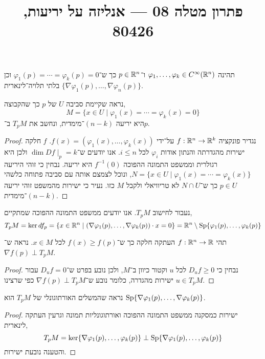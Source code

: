 
\title{פתרון מטלה 08 --- אנליזה על יריעות, 80426}

\DeclareMathOperator{\vol}{vol}


\maketitle
\maketitleprint[blue]

\question{}
תהינה $\varphi_1, \ldots, \varphi_k \in C^\infty(\mathbb{R}^n)$ ו־$p \in \mathbb{R}^n$ כך ש־$\varphi_1(p) = \cdots = \varphi_k(p) = 0$ וכן $\{ \nabla \varphi_1(p), \ldots, \nabla \varphi_n(p) \}$ בלתי תלויה־לינארית.

\subquestion{}
נראה שקיימת סביבה $U$ של $p$ כך שהקבוצה,
\[
	M
	= \{ x \in U \mid \varphi_1(x) = \cdots = \varphi_k(x) = 0 \}
\]
היא יריעה $(n - k)$־מימדית,
ונחשב את $T_p M$ ב־$p$.
\begin{proof}
	נגדיר פונקציה $f : \mathbb{R}^n \to \mathbb{R}^k$ על־ידי $f(x) = (\varphi_1(x), \ldots, \varphi_k(x))$.
	$f$ חלקה ישירות מהגדרתה והנתון אודות $\varphi_i$ לכל $i \le n$.
	אנו יודעים ש־$\dim D f \mid_p = k$ ולכן היא רגולרית וממשפט התמונה ההפוכה $f^{-1}(0)$ היא יריעה.
	נבחין כי זוהי היריעה $N = \{ x \in U \mid \varphi_1(x) = \cdots = \varphi_k(x) \}$, ונוכל לצמצם אותה עם סביבה פתוחה כלשהי $p \in U$ כך ש־$N \cap U$ לא טריוויאלי ולקבל $M$ כזו.
	נעיר כי ישירות מהמשפט זוהי יריעה $(n - k)$־מימדית.
\end{proof}
נעבור לחישוב $T_p M$.
אנו יודעים ממשפט התמונה ההפוכה שמתקיים,
\[
	T_p M
	= \ker df_p
	= \{ x \in \mathbb{R}^n \mid (\nabla \varphi_1(p), \ldots, \nabla \varphi_k(p)) \cdot x = 0 \}
	= \mathbb{R}^n \setminus \operatorname{Sp}\{ \varphi_1(p), \ldots, \varphi_k(p) \}
\]

\subquestion{}
תהי $f : \mathbb{R}^n \to \mathbb{R}$ העתקה חלקה כך ש־$f(x) \ge f(p)$ לכל $x \in M$.
נראה ש־$\nabla f(p) \perp T_p M$.
\begin{proof}
	נבחין כי $D_u f \ge 0$ לכל $u$ וקטור כיוון ב־$M$, ולכן נובע בפרט ש־$D_u f = 0$ עבור $u \in T_p M$ ישירות מהגדרה, כלומר נובע ש־$\nabla f(p) \perp T_p M$ כפי שרצינו.
\end{proof}

\subquestion{}
נראה שהמשלים האורתוגונלי של $T_p M$ הוא $\operatorname{Sp}\{ \nabla \varphi_1(p), \ldots, \nabla \varphi_k(p) \}$.
\begin{proof}
	ישירות כמסקנה ממשפט התמונה ההפוכה ואורתוגונליות תמונה וגרעין העתקה לינארית,
	\[
		T_p M
		= \ker\{ \nabla \varphi_1(p), \ldots, \varphi_k(p) \}
		\perp \operatorname{Sp}\{ \nabla \varphi_1(p), \ldots, \varphi_k(p) \}
	\]
	והטענה נובעת ישירות.
\end{proof}


